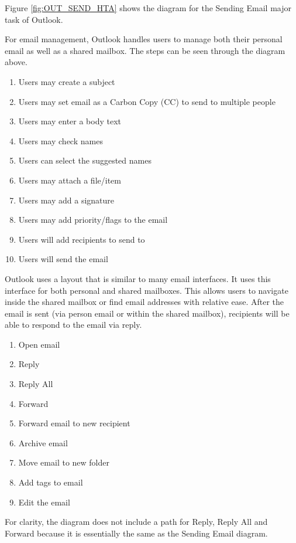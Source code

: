 \documentclass{sigchi}
\begin{document}
Figure \ref{fig:OUT_SEND_HTA} shows the diagram for the Sending Email major task of Outlook.

For email management, Outlook handles users to manage both their personal email as well as a shared mailbox.  The steps can be seen through the diagram above.

\begin{enumerate}
\item Users may create a subject
\item Users may set email as a Carbon Copy (CC) to send to multiple people
\item Users may enter a body text
\item Users may check names
\item Users can select the suggested names
\item Users may attach a file/item
\item Users may add a signature
\item Users may add priority/flags to the email
\item Users will add recipients to send to
\item Users will send the email
\end{enumerate}

Outlook uses a layout that is similar to many email interfaces. It uses this interface for both personal and shared mailboxes. This allows users to navigate inside the shared mailbox or find email addresses with relative ease.
After the email is sent (via person email or within the shared mailbox), recipients will be able to respond to the email via reply.

\begin{enumerate}
\item Open email
\item Reply
\item Reply All
\item Forward
\item Forward email to new recipient
\item Archive email
\item Move email to new folder
\item Add tags to email
\item Edit the email
\end{enumerate}

For clarity, the diagram does not include a path for Reply, Reply All and Forward because it is essentially the same as the Sending Email diagram.

\balance{}
\end{document}
